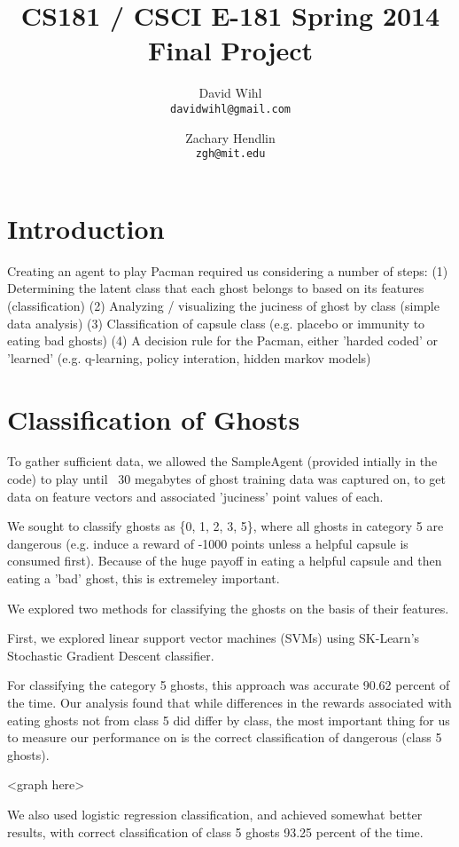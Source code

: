 \documentclass[11pt, oneside]{article}   	%
\title{CS181 / CSCI E-181 Spring 2014 Final Project}
\author{
  David Wihl\\
  \texttt{davidwihl@gmail.com}
  \and
  Zachary Hendlin\\
  \texttt{zgh@mit.edu} 
}
\begin{document}
\maketitle

\begingroup
\hypersetup{linkcolor=blue}
\tableofcontents
\endgroup

\section{Introduction}
Creating an agent to play Pacman required us considering a number of steps:
(1) Determining the latent class that each ghost belongs to based on its features (classification)
(2) Analyzing / visualizing the juciness of ghost by class (simple data analysis)
(3) Classification of capsule class (e.g. placebo or immunity to eating bad ghosts)
(4) A decision rule for the Pacman, either 'harded coded' or 'learned' (e.g. q-learning, policy interation, hidden markov models)

\section{Classification of Ghosts}
To gather sufficient data, we allowed the SampleAgent (provided intially in the code) to play until ~30 megabytes of ghost training data was captured on, to get data on feature vectors and associated 'juciness' point values of each.

We sought to classify ghosts as \{0, 1, 2, 3, 5\}, where all ghosts in category 5 are dangerous (e.g. induce a reward of -1000 points unless a helpful capsule is consumed first). Because of the huge payoff in eating a helpful capsule and then eating a 'bad' ghost, this is extremeley important.

We explored two methods for classifying the ghosts on the basis of their features.

First, we explored linear support vector machines (SVMs) using SK-Learn's Stochastic Gradient Descent classifier.

For classifying the category 5 ghosts, this approach was accurate 90.62 percent of the time. Our analysis found that while differences in the rewards associated with eating ghosts not from class 5 did differ by class, the most important thing for us to measure our performance on is the correct classification of dangerous (class 5 ghosts).

<graph here>

We also used logistic regression classification, and achieved somewhat better results, with correct classification of class 5 ghosts 93.25 percent of the time.
\end{document}
